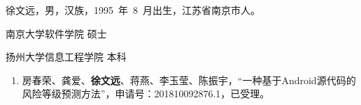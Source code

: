 \documentclass[master]{NJUthesis}
\theoremstyle{plain}
\begin{document}
\renewcommand*{\listtablename}{表~~目~~录}
\listoftables
{}
\renewcommand*{\listtablename}{图~~目~~录}
\listoffigures
{}

%

\mainmatter














\vspace{1ex}
\noindent 徐文远，男，汉族，1995~年~8~月出生，江苏省南京市人。
\vspace{2ex}

\begin{description}[labelindent=0em, leftmargin=8em, style=sameline]
\item[2018.9～2020.6] 南京大学软件学院 \hfill 硕士
\item[2014.9～2018.6] 扬州大学信息工程学院 \hfill 本科
\end{description}


\begin{enumerate}[label=\arabic*., labelindent=0em, leftmargin=*]
	\item 房春荣、龚爱、\textbf{徐文远}、蒋燕、李玉莹、陈振宇，``一种基于Android源代码的风险等级预测方法''，申请号：201810092876.1，已受理。
\end{enumerate}


\backmatter
\end{document}
